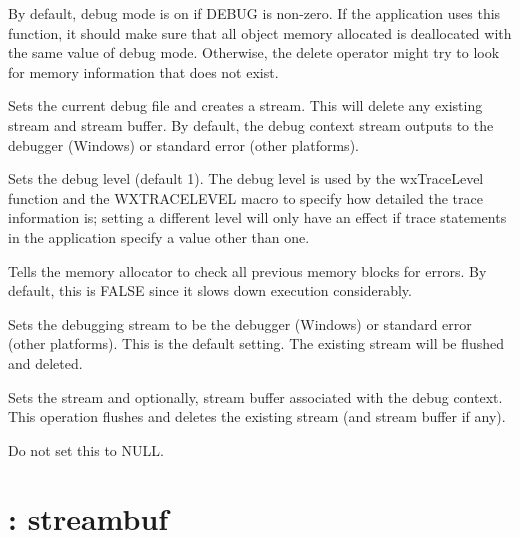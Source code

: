 By default, debug mode is on if DEBUG is non-zero. If the application
uses this function, it should make sure that all object memory allocated
is deallocated with the same value of debug mode. Otherwise, the
delete operator might try to look for memory information that does not
exist.



Sets the current debug file and creates a stream. This will delete any existing
stream and stream buffer. By default, the debug context stream
outputs to the debugger (Windows) or standard error (other platforms).



Sets the debug level (default 1). The debug level is used by the wxTraceLevel function and
the WXTRACELEVEL macro to specify how detailed the trace information is; setting
a different level will only have an effect if trace statements in the application
specify a value other than one.



Tells the memory allocator to check all previous memory blocks for errors.
By default, this is FALSE since it slows down execution considerably.



Sets the debugging stream to be the debugger (Windows) or standard error (other platforms).
This is the default setting. The existing stream will be flushed and deleted.



Sets the stream and optionally, stream buffer associated with the debug context.
This operation flushes and deletes the existing stream (and stream buffer if any).

Do not set this to NULL.


\section{: streambuf}\label{wxdebugstreambuf}

